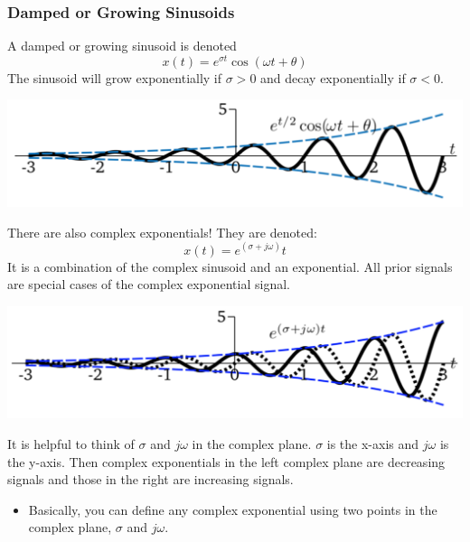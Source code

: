 \documentclass[10pt]{article}
\begin{document}
\subsubsection*{Damped or Growing Sinusoids}
A damped or growing sinusoid is denoted
\[x(t) = e^{\sigma t} \cos(\omega t + \theta)\]
The sinusoid will grow exponentially if $\sigma > 0$ and decay exponentially if $\sigma < 0$.
\begin{center}
    \includegraphics[scale=0.6]{W1_8.png}
\end{center}
There are also complex exponentials!  They are denoted:
\[x(t) = e^{(\sigma + j\omega)}t\]
It is a combination of the complex sinusoid and an exponential.  All prior signals are special cases of the complex exponential signal.
\begin{center}
    \includegraphics[scale=0.6]{W1_9.png}
\end{center}
It is helpful to think of $\sigma$ and $j\omega$ in the complex plane.  $\sigma$ is the x-axis and $j\omega$ is the y-axis.  Then complex exponentials in the left complex plane are decreasing signals and those in the right are increasing signals.
\begin{itemize}
    \item Basically, you can define any complex exponential using two points in the complex plane, $\sigma$ and $j\omega$.
\end{itemize}
\end{document}
